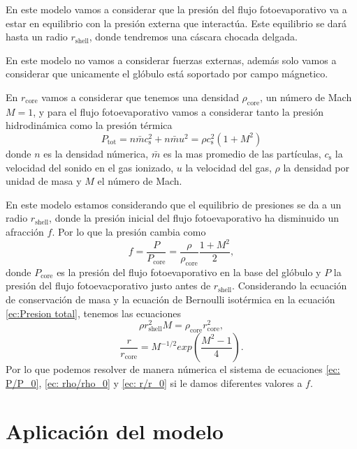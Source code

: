 \documentclass[twocolumn, times]{aastex631}
\begin{document}
En este modelo vamos a considerar que la presión del flujo fotoevaporativo va a estar en equilibrio con la presión externa que interactúa. Este equilibrio se dará hasta un radio $r_\mathrm{shell}$, donde tendremos una cáscara chocada delgada.

En este modelo no vamos a considerar fuerzas externas, además solo vamos a considerar que unicamente el glóbulo está soportado por campo mágnetico.

En $r_\mathrm{core}$ vamos a considerar que tenemos una densidad $\rho_\mathrm{core}$, un número de Mach $M=1$, y para el flujo fotoevaporativo vamos a considerar tanto la presión hidrodinámica como la presión térmica
\begin{equation}\label{ec:Presion total}
    P_\mathrm{tot}=n\bar{m}c_\mathrm{s}^2+n\bar{m}u^2=\rho c_\mathrm{s}^2(1+M^2)
\end{equation}
donde $n$ es la densidad númerica, $\bar{m}$ es la mas promedio de las partículas, $c_\mathrm{s}$ la velocidad del sonido en el gas ionizado, $u$ la velocidad del gas, $\rho$ la densidad por unidad de masa y $M$ el número de Mach.

En este modelo estamos considerando que el equilibrio de presiones se da a un radio $r_\mathrm{shell}$, donde la presión inicial del flujo fotoevaporativo ha disminuido un afracción $f$. Por lo que la presión cambia como
\begin{equation} \label{ec: P/P_0}
    f=\frac{P}{P_\mathrm{core}}=\frac{\rho}{\rho_\mathrm{core}}\frac{1+M^2}{2},
\end{equation}
donde $P_\mathrm{core}$ es la presión del flujo fotoevaporativo en la base del glóbulo y $P$ la presión del flujo fotoevacporativo justo antes de $r_\mathrm{shell}$. Considerando la ecuación de conservación de masa y la ecuación de Bernoulli isotérmica en la ecuación \ref{ec:Presion total}, tenemos las ecuaciones
\begin{equation}\label{ec: rho/rho_0}
    \rho r_\mathrm{shell}^2M=\rho_\mathrm{core}r_\mathrm{core}^2,
\end{equation}
\begin{equation}\label{ec: r/r_0}
    \frac{r}{r_\mathrm{core}}=M^{-1/2}exp\left(\frac{M^2-1}{4}\right).
\end{equation}
Por lo que podemos resolver de manera númerica el sistema de ecuaciones \ref{ec: P/P_0}, \ref{ec: rho/rho_0} y \ref{ec: r/r_0} si le damos diferentes valores a $f$.

\section{Aplicación del modelo}
\label{Sec:Aplicacioin}
\end{document}
